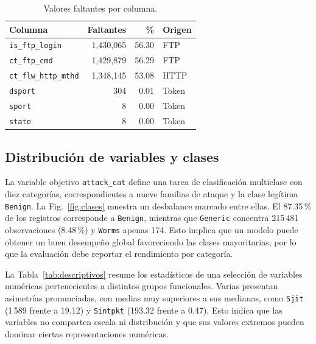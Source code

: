 \documentclass[conference]{IEEEtran}
\begin{document}
\begin{table}[H]
\centering
\caption{Valores faltantes por columna.}
\label{tab:faltantes}
\footnotesize
\begin{tabular}{lrrl}
\hline
\textbf{Columna} & \textbf{Faltantes} & \textbf{\%} & \textbf{Origen} \\
\hline
\texttt{is\_ftp\_login} & 1,430,065 & 56.30 & FTP \\
\texttt{ct\_ftp\_cmd}    & 1,429,879 & 56.29 & FTP \\
\texttt{ct\_flw\_http\_mthd} & 1,348,145 & 53.08 & HTTP \\
\texttt{dsport}          & 304       & 0.01  & Token \\
\texttt{sport}           & 8         & 0.00  & Token \\
\texttt{state}           & 8         & 0.00  & Token \\
\hline
\end{tabular}
\end{table}

\subsection{Distribución de variables y clases}

La variable objetivo \texttt{attack\_cat} define una tarea de clasificación multiclase con diez categorías, correspondientes a nueve familias de ataque y la clase legítima \texttt{Benign}. La Fig.~\ref{fig:clases} muestra un desbalance marcado entre ellas. El 87.35\,\% de los registros corresponde a \texttt{Benign}, mientras que \texttt{Generic} concentra 215\,481 observaciones (8.48\,\%) y \texttt{Worms} apenas 174. Esto implica que un modelo puede obtener un buen desempeño global favoreciendo las clases mayoritarias, por lo que la evaluación debe reportar el rendimiento por categoría.

La Tabla~\ref{tab:descriptivos} resume los estadísticos de una selección de variables numéricas pertenecientes a distintos grupos funcionales. Varias presentan asimetrías pronunciadas, con medias muy superiores a sus medianas, como \texttt{Sjit} (1\,589 frente a 19.12) y \texttt{Sintpkt} (193.32 frente a 0.47). Esto indica que las variables no comparten escala ni distribución y que sus valores extremos pueden dominar ciertas representaciones numéricas.
\end{document}

